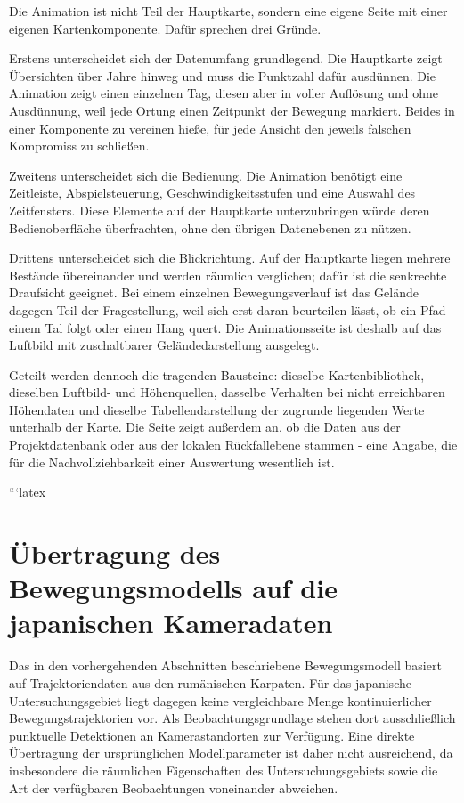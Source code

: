 \documentclass[12pt,a4paper]{report}
\begin{document}
Die Animation ist nicht Teil der Hauptkarte, sondern eine eigene Seite mit einer eigenen
Kartenkomponente. Dafür sprechen drei Gründe.

Erstens unterscheidet sich der Datenumfang grundlegend. Die Hauptkarte zeigt Übersichten
über Jahre hinweg und muss die Punktzahl dafür ausdünnen. Die Animation zeigt einen einzelnen
Tag, diesen aber in voller Auflösung und ohne Ausdünnung, weil jede Ortung einen Zeitpunkt
der Bewegung markiert. Beides in einer Komponente zu vereinen hieße, für jede Ansicht den
jeweils falschen Kompromiss zu schließen.

Zweitens unterscheidet sich die Bedienung. Die Animation benötigt eine Zeitleiste,
Abspielsteuerung, Geschwindigkeitsstufen und eine Auswahl des Zeitfensters. Diese Elemente
auf der Hauptkarte unterzubringen würde deren Bedienoberfläche überfrachten, ohne den
übrigen Datenebenen zu nützen.

Drittens unterscheidet sich die Blickrichtung. Auf der Hauptkarte liegen mehrere Bestände
übereinander und werden räumlich verglichen; dafür ist die senkrechte Draufsicht geeignet.
Bei einem einzelnen Bewegungsverlauf ist das Gelände dagegen Teil der Fragestellung, weil
sich erst daran beurteilen lässt, ob ein Pfad einem Tal folgt oder einen Hang quert. Die
Animationsseite ist deshalb auf das Luftbild mit zuschaltbarer Geländedarstellung ausgelegt.

Geteilt werden dennoch die tragenden Bausteine: dieselbe Kartenbibliothek, dieselben
Luftbild- und Höhenquellen, dasselbe Verhalten bei nicht erreichbaren Höhendaten und dieselbe
Tabellendarstellung der zugrunde liegenden Werte unterhalb der Karte. Die Seite zeigt
außerdem an, ob die Daten aus der Projektdatenbank oder aus der lokalen Rückfallebene
stammen - eine Angabe, die für die Nachvollziehbarkeit einer Auswertung wesentlich ist.

```latex
\section{Übertragung des Bewegungsmodells auf die japanischen Kameradaten}
\label{sec:uebertragung}

Das in den vorhergehenden Abschnitten beschriebene Bewegungsmodell basiert auf
Trajektoriendaten aus den rumänischen Karpaten. Für das japanische
Untersuchungsgebiet liegt dagegen keine vergleichbare Menge kontinuierlicher
Bewegungstrajektorien vor. Als Beobachtungsgrundlage stehen dort ausschließlich
punktuelle Detektionen an Kamerastandorten zur Verfügung. Eine direkte Übertragung
der ursprünglichen Modellparameter ist daher nicht ausreichend, da insbesondere
die räumlichen Eigenschaften des Untersuchungsgebiets sowie die Art der verfügbaren
Beobachtungen voneinander abweichen.
\end{document}
